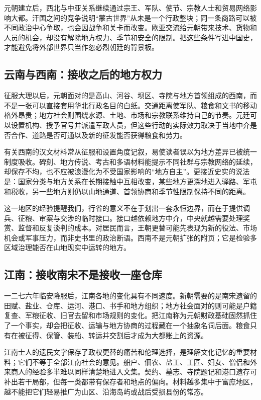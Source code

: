 元朝建立后，西北与中亚关系继续通过宗王、军队、使节、宗教人士和贸易网络影响大都。汗国之间的竞争说明“蒙古世界”从未是一个行政整块；同一条商路可以被不同政治中心争取，也会因战争和关卡而改变。欧亚交流给元朝带来技术、货物和人员的机会，却没有解除地方权力、季节和安全的限制。把这些条件写进中国史，才能避免将外部世界只当作忽必烈朝廷的背景板。

\subsection{云南与西南：接收之后的地方权力}

征服大理以后，元朝面对的是高山、河谷、坝区、寺院与地方首领组成的西南，而不是一张可以直接套用华北行政名目的白纸。交通距离使军队、粮食和文书的移动格外昂贵；地方社会则围绕水源、土地、市场和宗教联系维持自己的节奏。元廷可以设置机构、授予官号并派遣军政人员，但这些行动的实际效力取决于当地中介是否合作、道路是否可通以及新的征发能否获得粮食和劳力。

有关西南的汉文材料常从征服和设置角度记叙，易使读者误以为地方差异已被统一制度吸收。碑刻、地方传说、考古和多语材料能提示不同社群与宗教网络的延续，却保存不均，也不应被浪漫化为不受国家影响的“地方自主”。更接近史实的说法是：国家分类与地方关系在长期接触中互相改变，某些地方更深地进入驿路、军屯和税收，另一些地方则仍以山地通道、首领协商和季节性限制保持不同的距离。

这一地区的经验提醒我们，行省的意义不在于划出一套永恒边界，而在于提供调兵、征粮、审案与交涉的临时接口。接口越依赖地方中介，中央就越需要处理奖赏、监督和反复谈判的成本。对居民而言，王朝更替可能先表现为新的役法、市场机会或军事压力，而非史书里的政治断语。西南不是元朝扩张的附页；它是检验多区域治理能否在山地现实中运转的地方。

\subsection{江南：接收南宋不是接收一座仓库}

一二七六年临安降服后，江南各地的变化具有不同速度。新朝需要的是南宋遗留的田赋、盐业、仓库、运河、港口、书手和地方组织；地方社会面对的则可能是户籍复查、军粮征收、旧官去留和市场规则的变化。把江南称为元朝财政基础固然抓住了一个事实，却会把征收、运输与地方协商的过程藏在一个抽象名词后面。粮食只有在被征得、保管、装船、转运并交割后才成为大都账上的资源。

江南士人的遗民文字保存了政权更替的痛苦和伦理选择，是理解文化记忆的重要材料；它们不等于全部江南社会的意见。船户、佃农、盐工、工匠、妇女、僧侣和外来商人的经验多半难以同样清楚地进入文集。契约、墓志、寺院题记和港口遗存可补出若干局部，但每一类都带有保存者和地点的偏向。材料越多集中于富庶地区，越不能把它们轻易推广为山区、沿海岛屿或战后受损县份的常态。


